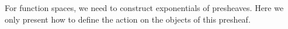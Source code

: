 For function spaces, we need to construct exponentials of presheaves.
Here we only present how to define the action on the objects of this presheaf.
